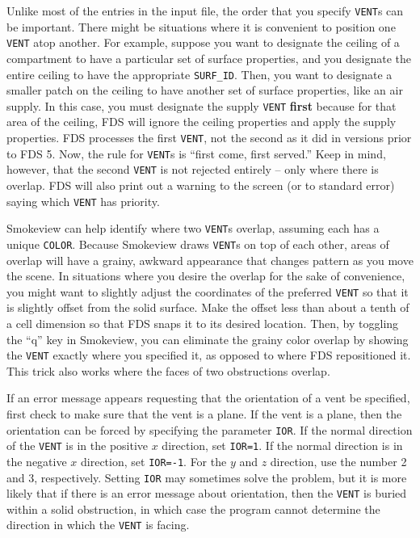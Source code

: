 \documentclass[11pt]{book}
\newcommand{\ct}{\tt\small}
\begin{document}
Unlike most of the entries in the input file, the order that you specify {\ct VENT}s can be important. There might be
situations where it is convenient to position one {\ct VENT} atop another. For example, suppose you want to designate the
ceiling of a compartment to have a particular set of surface properties, and you designate the entire ceiling to have the
appropriate {\ct SURF\_ID}. Then, you want to designate a smaller patch on the ceiling to have another set of surface
properties, like an air supply. In this case, you must designate the supply {\ct VENT} {\bf first} because for that area
of the ceiling, FDS will ignore the ceiling properties and apply the supply properties. FDS processes the first {\ct VENT}, not
the second as it did in versions prior to FDS 5. Now, the rule for {\ct VENT}s is ``first come, first served.''
Keep in mind, however, that the
second {\ct VENT} is not rejected entirely -- only where there is overlap. FDS will also print out a warning to the screen (or to
standard error) saying which {\ct VENT} has priority.

Smokeview can help identify where two {\ct VENT}s overlap, assuming each has a unique {\ct COLOR}. Because Smokeview draws {\ct VENT}s
on top of each other, areas of overlap will have a grainy, awkward appearance that changes pattern as you move the scene. In situations
where you desire the overlap for the sake of convenience, you might want to slightly adjust the coordinates of the preferred {\ct VENT}
so that it is slightly offset from the solid surface. Make the offset less than about a tenth of a cell dimension so that FDS snaps it
to its desired location. Then, by toggling the ``q'' key in Smokeview, you can eliminate the grainy color overlap by showing the
{\ct VENT} exactly where you specified it, as opposed to where FDS repositioned it. This trick also works where the faces of two
obstructions overlap.

If an error message appears requesting that
the orientation of a vent be specified, first check to make sure that the vent is a plane.
If the vent is a plane, then the orientation can be forced by specifying the parameter {\ct IOR}.
If the normal direction of the {\ct VENT} is in the positive $x$ direction, set {\ct IOR=1}.
If the normal direction is in the negative $x$ direction, set {\ct IOR=-1}. For the $y$ and
$z$ direction, use the number 2 and 3, respectively. Setting {\ct IOR} may sometimes solve
the problem, but it is more likely that if there is an error message about orientation, then
the {\ct VENT} is buried within a solid obstruction, in which case the program cannot determine
the direction in which the {\ct VENT} is facing.
\end{document}
